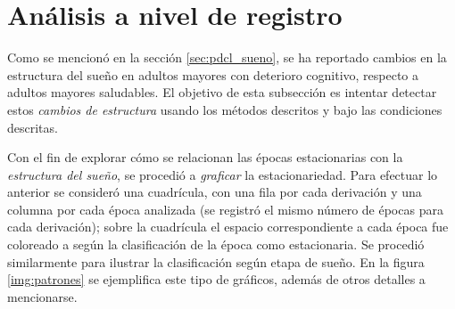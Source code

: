 \documentclass[12pt,letterpaper]{book}
\begin{document}
\section{Análisis a nivel de registro}
\label{sec:analisis_registro}

Como se mencionó en la sección \ref{sec:pdcl_sueno}, se ha reportado cambios en la estructura del sueño en adultos mayores con deterioro cognitivo, respecto a adultos mayores saludables.
%
El objetivo de esta subsección es intentar detectar estos \textit{cambios de estructura} usando los métodos descritos y bajo las condiciones descritas.

Con el fin de explorar cómo se relacionan las épocas estacionarias con la \textit{estructura del sueño}, se procedió a \textit{graficar} la estacionariedad.
%
Para efectuar lo anterior se consideró una cuadrícula, con una fila por cada derivación y una columna por cada época analizada (se registró el mismo número de épocas para cada derivación); sobre la cuadrícula el espacio correspondiente a cada época fue coloreado a según la clasificación de la época como estacionaria.
%
Se procedió similarmente para ilustrar la clasificación según etapa de sueño.
%
En la figura \ref{img:patrones} se ejemplifica este tipo de gráficos, además de otros detalles a mencionarse.
\end{document}
